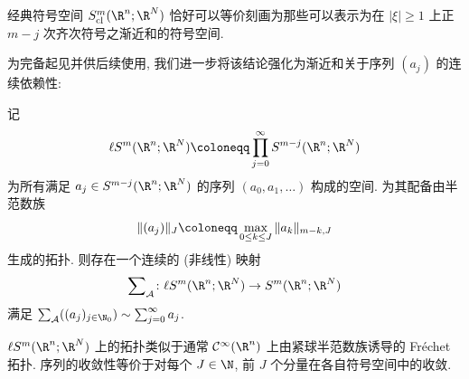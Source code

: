 经典符号空间 $S_{\mathrm{cl}}^m(\R^n; \R^N)$ 恰好可以等价刻画为那些可以表示为在 $|\xi| \ge 1$ 上正 $m-j$ 次齐次符号之渐近和的符号空间.

为完备起见并供后续使用, 我们进一步将该结论强化为渐近和关于序列 $(a_j)$ 的连续依赖性:

\begin{proposition}[连续渐近求和映射]\label{prop:3.17}
记
\begin{equation}\label{eq:3.40}
    \ell S^m(\R^n; \R^N) \defeq \prod_{j=0}^\infty S^{m-j}(\R^n; \R^N)
\end{equation}
为所有满足 $a_j \in S^{m-j}(\R^n; \R^N)$ 的序列 $(a_0, a_1, \ldots)$ 构成的空间. 为其配备由半范数族
\[
    \|(a_j)\|_J \defeq \max_{0 \le k \le J} \|a_k\|_{m-k, J}
\]
生成的拓扑. 则存在一个连续的 (非线性) 映射
\begin{equation}\label{eq:3.41}
    \sum\nolimits_{\mathcal{A}} \colon \ell S^m(\R^n; \R^N) \to S^m(\R^n; \R^N)
\end{equation}
满足 $\sum_{\mathcal{A}}((a_j)_{j \in \N_0}) \sim \sum_{j=0}^\infty a_j$.
\end{proposition}

\begin{remark}\label{rem:3.18}
$\ell S^m(\R^n; \R^N)$ 上的拓扑类似于通常 $\Smooth(\R^n)$ 上由紧球半范数族诱导的 Fréchet 拓扑. 序列的收敛性等价于对每个 $J \in \N$, 前 $J$ 个分量在各自符号空间中的收敛.
\end{remark}

